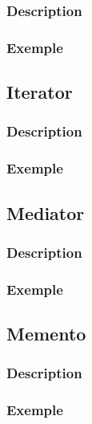 \documentclass[french]{article}
\begin{document}
\subsubsection{Description}



\subsubsection{Exemple}



\subsection{Iterator}

\subsubsection{Description}



\subsubsection{Exemple}



\subsection{Mediator}

\subsubsection{Description}



\subsubsection{Exemple}



\subsection{Memento}

\subsubsection{Description}



\subsubsection{Exemple}
\end{document}
